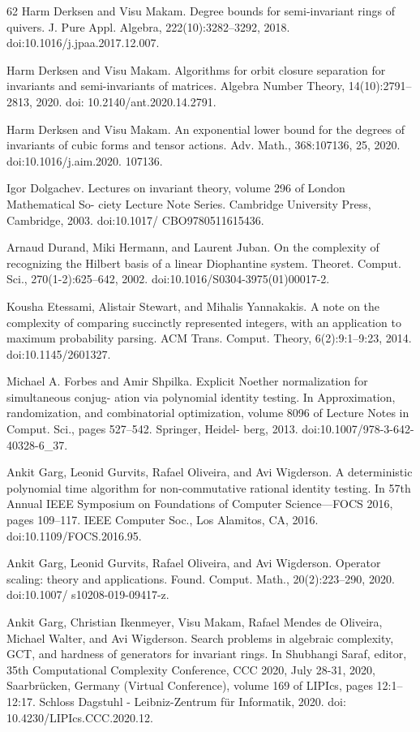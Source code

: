 \documentclass[10pt,a4paper]{article}
\theoremstyle{definition}
\numberwithin{equation}{section}
\begin{document}
\begin{thebibliography}{62}
Harm Derksen and Visu Makam. Degree bounds for semi-invariant rings of quivers. J. Pure Appl. Algebra, 222(10):3282–3292, 2018. doi:10.1016/j.jpaa.2017.12.007.

Harm Derksen and Visu Makam. Algorithms for orbit closure separation for invariants and semi-invariants of matrices. Algebra Number Theory, 14(10):2791–2813, 2020. doi: 10.2140/ant.2020.14.2791.

Harm Derksen and Visu Makam. An exponential lower bound for the degrees of invariants of cubic forms and tensor actions. Adv. Math., 368:107136, 25, 2020. doi:10.1016/j.aim.2020. 107136.

Igor Dolgachev. Lectures on invariant theory, volume 296 of London Mathematical So- ciety Lecture Note Series. Cambridge University Press, Cambridge, 2003. doi:10.1017/ CBO9780511615436.

Arnaud Durand, Miki Hermann, and Laurent Juban. On the complexity of recognizing the Hilbert basis of a linear Diophantine system. Theoret. Comput. Sci., 270(1-2):625–642, 2002. doi:10.1016/S0304-3975(01)00017-2.

Kousha Etessami, Alistair Stewart, and Mihalis Yannakakis. A note on the complexity of comparing succinctly represented integers, with an application to maximum probability parsing. ACM Trans. Comput. Theory, 6(2):9:1–9:23, 2014. doi:10.1145/2601327.

Michael A. Forbes and Amir Shpilka. Explicit Noether normalization for simultaneous conjug- ation via polynomial identity testing. In Approximation, randomization, and combinatorial optimization, volume 8096 of Lecture Notes in Comput. Sci., pages 527–542. Springer, Heidel- berg, 2013. doi:10.1007/978-3-642-40328-6\_37.

Ankit Garg, Leonid Gurvits, Rafael Oliveira, and Avi Wigderson. A deterministic polynomial time algorithm for non-commutative rational identity testing. In 57th Annual IEEE Symposium on Foundations of Computer Science—FOCS 2016, pages 109–117. IEEE Computer Soc., Los Alamitos, CA, 2016. doi:10.1109/FOCS.2016.95.

Ankit Garg, Leonid Gurvits, Rafael Oliveira, and Avi Wigderson. Operator scaling: theory and applications. Found. Comput. Math., 20(2):223–290, 2020. doi:10.1007/ s10208-019-09417-z.

Ankit Garg, Christian Ikenmeyer, Visu Makam, Rafael Mendes de Oliveira, Michael Walter, and Avi Wigderson. Search problems in algebraic complexity, GCT, and hardness of generators for invariant rings. In Shubhangi Saraf, editor, 35th Computational Complexity Conference, CCC 2020, July 28-31, 2020, Saarbrücken, Germany (Virtual Conference), volume 169 of LIPIcs, pages 12:1–12:17. Schloss Dagstuhl - Leibniz-Zentrum für Informatik, 2020. doi: 10.4230/LIPIcs.CCC.2020.12.


\end{thebibliography}
\end{document}
